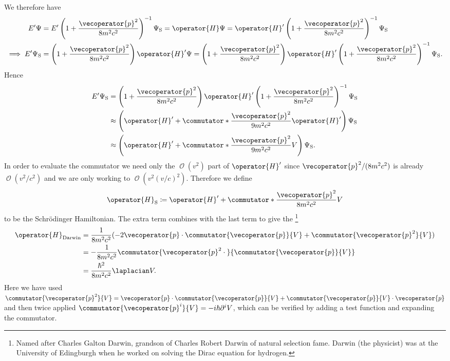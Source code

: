 \documentclass[fleqn]{NotesClass}
\newcommand*{\order}{\mathop{\mathcal{O}}}
\newcommand*{\hamiltonian}{H}
\begin{document}
    We therefore have
    \begin{align}
        E'\Psi &= E'\left( 1 + \frac{\vecoperator{p}^2}{8m^2c^2} \right)^{-1}\Psi_{\mathrm{S}} = \operator{\hamiltonian}\Psi = \operator{\hamiltonian}'\left( 1 + \frac{\vecoperator{p}^2}{8m^2c^2} \right)^{-1}\Psi_{\mathrm{S}}\\
        \implies E'\Psi_{\mathrm{S}} &= \left( 1 + \frac{\vecoperator{p}^2}{8m^2c^2} \right)\operator{\hamiltonian}'\Psi = \left( 1 + \frac{\vecoperator{p}^2}{8m^2c^2} \right) \operator{\hamiltonian}' \left( 1 + \frac{\vecoperator{p}^2}{8m^2c^2} \right)^{-1}\Psi_{\mathrm{S}}.
    \end{align}
    Hence
    \begin{align}
        E'\Psi_{\mathrm{S}} &= \left( 1 + \frac{\vecoperator{p}^2}{8m^2c^2} \right) \operator{\hamiltonian}' \left( 1 + \frac{\vecoperator{p}^2}{8m^2c^2} \right)^{-1} \Psi_{\mathrm{S}}\\
        &\approx \left( \operator{\hamiltonian}' + \commutator*{\frac{\vecoperator{p}^2}{9m^2c^2}}{\operator{\hamiltonian}'} \right)\Psi_{\mathrm{S}}\\
        &\approx \left( \operator{\hamiltonian}' + \commutator*{\frac{\vecoperator{p}^2}{9m^2c^2}}{V} \right)\Psi_{\mathrm{S}}.
    \end{align}
    In order to evaluate the commutator we need only the \(\order(v^2)\) part of \(\operator{\hamiltonian}'\) since \(\vecoperator{p}^2/(8m^2c^2)\) is already \(\order(v^2/c^2)\) and we are only working to \(\order(v^2(v/c)^2)\).
    Therefore we define
    \begin{equation}
        \operator{\hamiltonian}_{\mathrm{S}} \coloneqq \operator{\hamiltonian}' + \commutator*{\frac{\vecoperator{p}^2}{8m^2c^2}}{V}
    \end{equation}
    to be the Schr\"odinger Hamiltonian.
    The extra term combines with the last term to give the \footnote{Named after Charles Galton Darwin, grandson of Charles Robert Darwin of natural selection fame. Darwin (the physicist) was at the University of Edingburgh when he worked on solving the Dirac equation for hydrogen.}
    \begin{align}
        \operator{\hamiltonian}_{\mathrm{Darwin}} &= \frac{1}{8m^2c^2} (-2\vecoperator{p} \cdot \commutator{\vecoperator{p}}{V} + \commutator{\vecoperator{p}^2}{V})\\
        &= -\frac{1}{8m^2c^2} \commutator{\vecoperator{p}^2 \cdot {}}{\commutator{\vecoperator{p}}{V}}\\
        &= \frac{\hbar^2}{8m^2c^2} \laplacian V.
    \end{align}
    Here we have used \(\commutator{\vecoperator{p}^2}{V} = \vecoperator{p} \cdot \commutator{\vecoperator{p}}{V} + \commutator{\vecoperator{p}}{V} \cdot \vecoperator{p}\) and then twice applied \(\commutator{\vecoperator{p}^i}{V} = -i\hbar\partial^iV\), which can be verified by adding a test function and expanding the commutator.
    
\end{document}
